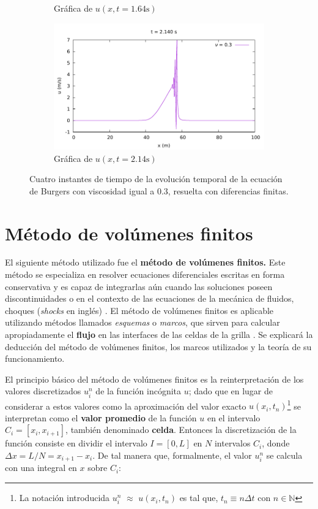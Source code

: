 \documentclass[12pt]{article}
\begin{document}
\begin{figure}[ht]
\begin{subfigure}[b]{0.4\textwidth}
			\caption*{Gráfica de $u(x,t=1.64\unit{\second})$}
			\label{fig:vis0.3-3}
		\end{subfigure}
		\hfill
		\begin{subfigure}[b]{0.4\textwidth}
			\includegraphics[width=\textwidth]{../burg-vis1DDF/results/frames0.3/frame107.pdf}
			\caption*{Gráfica de $u(x,t=2.14\unit{\second})$}
			\label{fig:vis0.3-4}
		\end{subfigure}
		\caption{Cuatro instantes de tiempo de la evolución temporal de la ecuación de Burgers con viscosidad igual a $0.3$, resuelta con diferencias finitas.}
		\label{fig:instantes-nu0.3}
	\end{figure}
	
	\section{Método de volúmenes finitos}
	El siguiente método utilizado fue el \textbf{método de volúmenes finitos.} Este método se especializa en resolver ecuaciones diferenciales escritas en forma conservativa y es capaz de integrarlas aún cuando las soluciones poseen discontinuidades o  en el contexto de las ecuaciones de la mecánica de fluidos, choques (\textit{shocks} en inglés) \cite{LeVeque1998}. El método de volúmenes finitos es aplicable utilizando métodos llamados \textit{esquemas} o \textit{marcos}, que sirven para calcular apropiadamente el \textbf{flujo} en las interfaces de las celdas de la grilla \cite{LeVeque1998}. Se explicará la deducción del método de volúmenes finitos, los marcos utilizados y la teoría de su funcionamiento.
	
	El principio básico del método de volúmenes finitos es la reinterpretación de los valores discretizados $u_{i}^{n}$ de la función incógnita $u$; dado que en lugar de considerar a estos valores como la aproximación del valor exacto $u(x_{i}, t_{n}) $\footnote{La notación introducida $u_{i}^{n}$ $\approx$ $u(x_{i}, t_{n})$ es tal que, $t_n \equiv n \Delta t $ con $n \in \mathbb{N}$} se interpretan como el \textbf{valor promedio} de la función $u$ en el intervalo $C_{i} = \left[ x_i, x_{i+1} \right]$, también denominado \textbf{celda}. Entonces la discretización de la función consiste en dividir el intervalo $I = [0,L]$ en $N$ intervalos $C_i$, donde $\Delta x = L/N = x_{i+1} - x_i$. De tal manera que, formalmente, el valor $u_{i}^{n}$ se calcula con una integral en $x$ sobre $C_i$:
	
\end{document}
